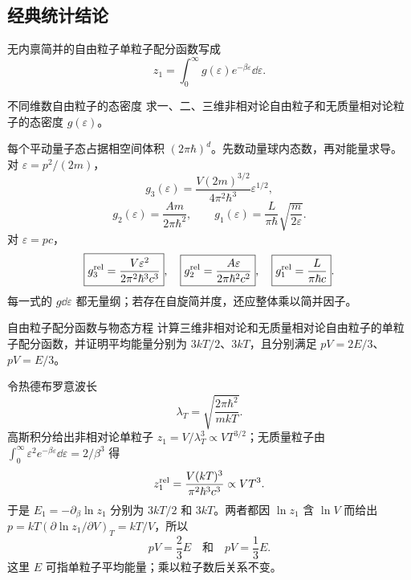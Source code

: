 \subsection{经典统计结论}

无内禀简并的自由粒子单粒子配分函数写成
\[
 z_1=\int_0^\infty g(\varepsilon)e^{-\beta\varepsilon}\dd\varepsilon.
\]

\begin{advexamplebox}{不同维数自由粒子的态密度}\label{advA2:ex:density-of-states}
求一、二、三维非相对论自由粒子和无质量相对论粒子的态密度 $g(\varepsilon)$。

\AQDensityStates
\end{advexamplebox}
\begin{advsolution}
\AADensityStates

每个平动量子态占据相空间体积 $(2\pi\hbar)^d$。先数动量球内态数，再对能量求导。
对 $\varepsilon=p^2/(2m)$，
\[
 \boxed{g_{3}(\varepsilon)=\frac{V(2m)^{3/2}}{4\pi^2\hbar^3}\varepsilon^{1/2}},
\]
\[
 \boxed{g_{2}(\varepsilon)=\frac{Am}{2\pi\hbar^2}},
 \qquad
 \boxed{g_{1}(\varepsilon)=\frac{L}{\pi\hbar}\sqrt{\frac{m}{2\varepsilon}}}.
\]
对 $\varepsilon=pc$，
\[
 \boxed{g_{3}^{\rm rel}=\frac{V\varepsilon^2}{2\pi^2\hbar^3c^3}},
 \quad
 \boxed{g_{2}^{\rm rel}=\frac{A\varepsilon}{2\pi\hbar^2c^2}},
 \quad
 \boxed{g_{1}^{\rm rel}=\frac{L}{\pi\hbar c}}.
\]
每一式的 $g\dd\varepsilon$ 都无量纲；若存在自旋简并度，还应整体乘以简并因子。
\end{advsolution}

\begin{advexamplebox}{自由粒子配分函数与物态方程}\label{advA2:ex:free-particle-partition}
计算三维非相对论和无质量相对论自由粒子的单粒子配分函数，并证明平均能量分别为
$3kT/2$、$3kT$，且分别满足 $pV=2E/3$、$pV=E/3$。

\AQFreePartition
\end{advexamplebox}
\begin{advsolution}
\AAFreePartition

令热德布罗意波长
\[
 \lambda_T=\sqrt{\frac{2\pi\hbar^2}{mkT}}.
\]
高斯积分给出非相对论单粒子
$z_1=V/\lambda_T^3\propto VT^{3/2}$；无质量粒子由
$\int_0^\infty\varepsilon^2e^{-\beta\varepsilon}\dd\varepsilon=2/\beta^3$ 得
\[
 z_1^{\rm rel}=\frac{V(kT)^3}{\pi^2\hbar^3c^3}\propto VT^3.
\]
于是 $E_1=-\partial_\beta\ln z_1$ 分别为 $3kT/2$ 和 $3kT$。两者都因 $\ln z_1$ 含 $\ln V$ 而给出
$p=kT(\partial\ln z_1/\partial V)_T=kT/V$，所以
\[
 \boxed{pV=\frac23E}\quad\text{和}\quad
 \boxed{pV=\frac13E}.
\]
这里 $E$ 可指单粒子平均能量；乘以粒子数后关系不变。
\end{advsolution}

